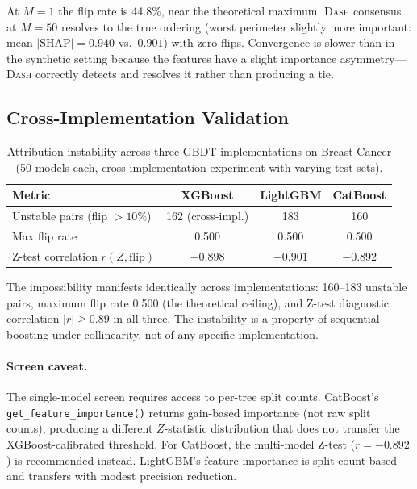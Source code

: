 \documentclass{article}
\newcommand{\SHAP}{\mathrm{SHAP}}
\newcommand{\DASH}{\textsc{Dash}}
\begin{document}
At $M{=}1$ the flip rate is 44.8\%, near the theoretical maximum. \DASH{} consensus at $M{=}50$ resolves to the true ordering (worst perimeter slightly more important: mean $|\SHAP| = 0.940$ vs.\ $0.901$) with zero flips. Convergence is slower than in the synthetic setting because the features have a slight importance asymmetry---\DASH{} correctly detects and resolves it rather than producing a tie.

\subsection{Cross-Implementation Validation}

\begin{table}[t]
\centering
\caption{Attribution instability across three GBDT implementations on Breast Cancer (50 models each, cross-implementation experiment with varying test sets).}
\label{tab:cross-impl}
\small
\begin{tabular}{@{}lccc@{}}
\toprule
Metric & XGBoost & LightGBM & CatBoost \\
\midrule
Unstable pairs (flip $> 10\%$) & 162 (cross-impl.) & 183 & 160 \\
Max flip rate & 0.500 & 0.500 & 0.500 \\
Z-test correlation $r(Z, \text{flip})$ & $-0.898$ & $-0.901$ & $-0.892$ \\
\bottomrule
\end{tabular}
\end{table}

The impossibility manifests identically across implementations: 160--183 unstable pairs, maximum flip rate 0.500 (the theoretical ceiling), and Z-test diagnostic correlation $|r| \geq 0.89$ in all three. The instability is a property of sequential boosting under collinearity, not of any specific implementation.

\paragraph{Screen caveat.}
\begin{sloppypar}
The single-model screen requires access to per-tree split counts.
CatBoost's \texttt{get\_feature\_importance()} returns gain-based importance
(not raw split counts), producing a different $Z$-statistic distribution that
does not transfer the XGBoost-calibrated threshold. For CatBoost, the multi-model
Z-test ($r = -0.892$) is recommended instead. LightGBM's feature
importance is split-count based and transfers with modest precision reduction.
\end{sloppypar}
\end{document}
